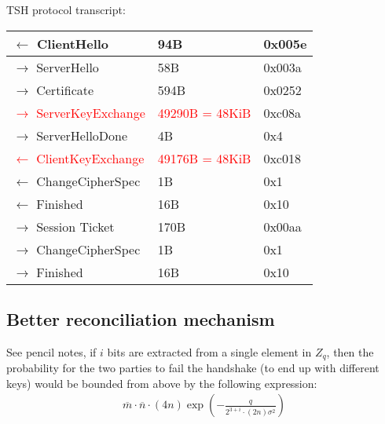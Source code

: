 \documentclass[12pt]{article}
\newcommand{\nbar}{\overline{n}}
\newcommand{\mbar}{\overline{m}}
\begin{document}
TSH protocol transcript:
\begin{center}
    \begin{tabular}{| l | l | l |}
    \hline
    $\leftarrow$ ClientHello & 94B & 0x005e\\ \hline
    $\rightarrow$ ServerHello & 58B & 0x003a\\ \hline
    $\rightarrow$ Certificate & 594B & 0x0252\\ \hline
    \textcolor{red}{$\rightarrow$ ServerKeyExchange} & \textcolor{red}{49290B = 48KiB} & 0xc08a\\ \hline
    $\rightarrow$ ServerHelloDone & 4B & 0x4\\ \hline
    \textcolor{red}{$\leftarrow$ ClientKeyExchange} & \textcolor{red}{49176B = 48KiB} & 0xc018\\ \hline
    $\leftarrow$ ChangeCipherSpec & 1B & 0x1\\ \hline
    $\leftarrow$ Finished & 16B & 0x10\\ \hline
    $\rightarrow$ Session Ticket & 170B & 0x00aa\\ \hline
    $\rightarrow$ ChangeCipherSpec & 1B & 0x1\\ \hline
    $\rightarrow$ Finished & 16B & 0x10\\ \hline
    \end{tabular}
\end{center}

\subsection{Better reconciliation mechanism}
See pencil notes, if $i$ bits are extracted from a single element in $Z_q$, then the probability for the two parties to fail the handshake (to end up with different keys) would be bounded from above by the following expression:
\begin{align*}
\mbar \cdot \nbar \cdot (4n) \exp\left(-\frac{q}{2^{3 + i} \cdot (2n) \sigma^2}\right)
\end{align*}
\end{document}
